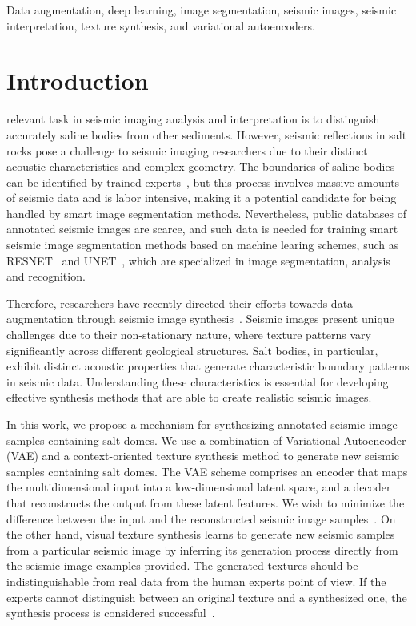 \documentclass{ieeeaccess}
\begin{document}
\begin{keywords}
Data augmentation, deep learning, image segmentation, seismic images, seismic interpretation, texture synthesis, and variational autoencoders.
\end{keywords}

\titlepgskip=-21pt

\maketitle

\section{Introduction}
\label{sec:introduction}
 relevant task in seismic imaging analysis and interpretation is to distinguish accurately saline bodies from other sediments. However, seismic reflections in salt rocks pose a challenge to seismic imaging researchers due to their distinct acoustic characteristics and complex geometry. The boundaries of saline bodies can be identified by trained experts~\cite{Zeng2019}, but this process involves massive amounts of seismic data and is labor intensive, making it a potential candidate for being handled by smart image segmentation methods. Nevertheless, public databases of annotated seismic images are scarce, and such data is needed for training smart seismic image segmentation methods based on machine learing schemes, such as RESNET~\cite{He2016} and UNET~\cite{Ronneberger2015}, which are specialized in image segmentation, analysis and recognition. 

Therefore, researchers have recently directed their efforts towards data augmentation through seismic image synthesis~\cite{Henriques2021}. Seismic images present unique challenges due to their non-stationary nature, where texture patterns vary significantly across different geological structures. Salt bodies, in particular, exhibit distinct acoustic properties that generate characteristic boundary patterns in seismic data. Understanding these characteristics is essential for developing effective synthesis methods that are able to create realistic seismic images.

In this work, we propose a mechanism for synthesizing annotated seismic image samples containing salt domes. We use a combination of Variational Autoencoder (VAE) and a context-oriented texture synthesis method to generate new seismic samples containing salt domes. The VAE scheme comprises an encoder that maps the multidimensional input into a low-dimensional latent space, and a decoder that reconstructs the output from these latent features. We wish to minimize the difference between the input and the reconstructed seismic image samples~\cite{Li2020}. On the other hand, visual texture synthesis learns to generate new seismic samples from a particular seismic image by inferring its generation process directly from the seismic image examples provided. The generated textures should be indistinguishable from real data from the human experts point of view. If the experts cannot distinguish between an original texture and a synthesized one, the synthesis process is considered successful~\cite{Gatys2015}.
\end{document}
